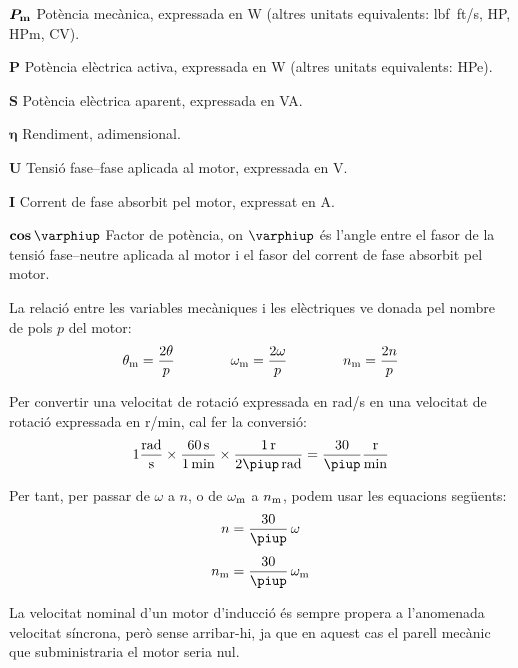 \begin{list}{}
   \item[$\boldsymbol{P_\mathrm{m}}$] Potència mecànica, expressada en \si{W} (altres unitats equivalents: \si{lbf.ft/s}, \si{HP},  \si{HPm}, \si{CV}).
   \item[$\boldsymbol{P}$] Potència elèctrica activa, expressada en \si{W} (altres unitats equivalents: \si{HPe}).
   \item[$\boldsymbol{S}$] Potència elèctrica aparent, expressada en \si{VA}.
   \item[$\boldsymbol{\eta}$] Rendiment, adimensional.
   \item[$\boldsymbol{U}$] Tensió fase--fase aplicada al motor, expressada en \si{V}.
   \item[$\boldsymbol{I}$] Corrent de fase absorbit pel motor, expressat en \si{A}.
   \item[$\boldsymbol{\cos\varphiup}$] Factor de potència, on $\varphiup$ és l'angle entre el fasor de la tensió fase--neutre aplicada al motor i el fasor del corrent de fase absorbit pel motor.
\end{list}

La relació entre les variables mecàniques i les elèctriques ve donada pel nombre de pols $p$ del motor:
\begin{equation}\label{eq:vel-ele-mec}
    \theta_\mathrm{m} = \frac{2\theta}{p} \qquad\qquad
    \omega_\mathrm{m} = \frac{2\omega}{p} \qquad\qquad
    n_\mathrm{m} = \frac{2n}{p}
\end{equation}

Per  convertir una velocitat de rotació expressada en \si{rad/s} en una velocitat de rotació expressada en \si{r/min}, cal fer la conversió:
\begin{equation}
 1\frac{\si{rad}}{\si{s}} \times \frac{\SI{60}{s}}{\SI{1}{min}} \times \frac{\SI{1}{r}}{2\piup\,\si{rad}} = \frac{30}{\piup}\frac{\si{r}}{\si{min}}
 \end{equation}

 Per tant, per passar de $\omega$ a $n$, o de $\omega_\mathrm{m}$ a $n_\mathrm{m}$, podem usar les equacions següents:
\begin{subequations}
\begin{align}
    n        &= \frac{30}{\piup} \,\omega \\[1ex]
    n\ped{m} &= \frac{30}{\piup} \,\omega\ped{m}
\end{align}
\end{subequations}

La velocitat nominal d'un motor d'inducció és sempre propera a l'anomenada velocitat síncrona, però sense arribar-hi, ja que en aquest cas el parell mecànic que subministraria el motor seria nul.

